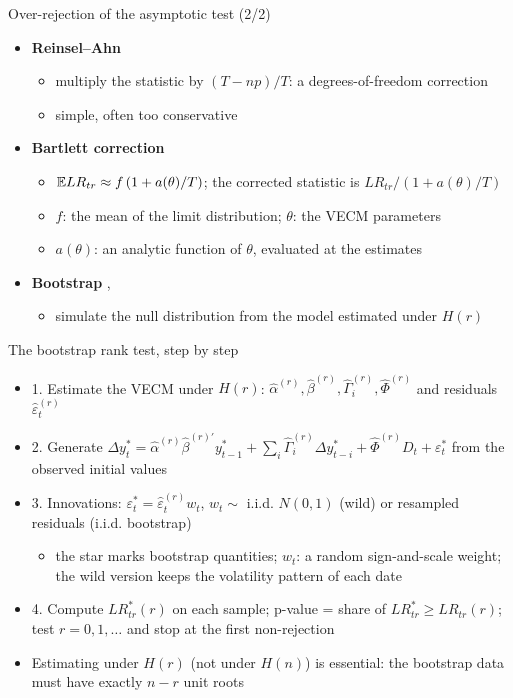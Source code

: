 \begin{frame}{Over-rejection of the asymptotic test (2/2)}
\itemsize{\small}
\begin{itemize}
    \item \textbf{Reinsel--Ahn} 
    \begin{itemize}
        \item multiply the statistic by $(T - np)/T$: a degrees-of-freedom correction
        \item simple, often too conservative
    \end{itemize}
    \item \textbf{Bartlett correction} 
    \begin{itemize}
        \item $\mathbb{E} LR_{tr} \approx f\,(1 + a(\theta)/T)$; the corrected statistic is $LR_{tr}/(1 + a(\theta)/T)$
        \item $f$: the mean of the limit distribution; $\theta$: the VECM parameters
        \item $a(\theta)$: an analytic function of $\theta$, evaluated at the estimates
    \end{itemize}
    \item \textbf{Bootstrap} , 
    \begin{itemize}
        \item simulate the null distribution from the model estimated under $H(r)$
    \end{itemize}
\end{itemize}
\end{frame}

\begin{frame}{The bootstrap rank test, step by step}
\itemsize{\small}
\begin{itemize}
    \item 1. Estimate the VECM under $H(r)$: $\hat\alpha^{(r)}, \hat\beta^{(r)}, \hat\Gamma_i^{(r)}, \hat\Phi^{(r)}$ and residuals $\hat\varepsilon_t^{(r)}$
    \item 2. Generate $\Delta y_t^* = \hat\alpha^{(r)}\hat\beta^{(r)\prime}y_{t-1}^* + \sum_i\hat\Gamma_i^{(r)}\Delta y_{t-i}^* + \hat\Phi^{(r)}D_t + \varepsilon_t^*$ from the observed initial values
    \item 3. Innovations: $\varepsilon_t^* = \hat\varepsilon_t^{(r)}w_t$, $w_t \sim$ i.i.d. $N(0, 1)$ (wild) or resampled residuals (i.i.d. bootstrap)
    \begin{itemize}
        \item the star marks bootstrap quantities; $w_t$: a random sign-and-scale weight; the wild version keeps the volatility pattern of each date
    \end{itemize}
    \item 4. Compute $LR_{tr}^*(r)$ on each sample; p-value = share of $LR_{tr}^* \ge LR_{tr}(r)$; test $r = 0, 1, \dots$ and stop at the first non-rejection
    \item Estimating under $H(r)$ (not under $H(n)$) is essential: the bootstrap data must have exactly $n - r$ unit roots 
\end{itemize}
\end{frame}

